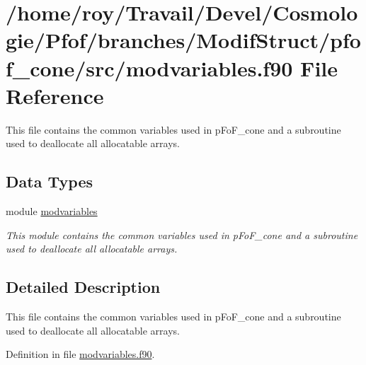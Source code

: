 \hypertarget{modvariables_8f90}{\section{/home/roy/\-Travail/\-Devel/\-Cosmologie/\-Pfof/branches/\-Modif\-Struct/pfof\-\_\-cone/src/modvariables.f90 File Reference}
\label{modvariables_8f90}
}


This file contains the common variables used in p\-Fo\-F\-\_\-cone and a subroutine used to deallocate all allocatable arrays.  


\subsection*{Data Types}
\begin{DoxyCompactItemize}
\item 
module \hyperlink{classmodvariables}{modvariables}
\begin{DoxyCompactList}\small\item\em This module contains the common variables used in p\-Fo\-F\-\_\-cone and a subroutine used to deallocate all allocatable arrays. \end{DoxyCompactList}\end{DoxyCompactItemize}


\subsection{Detailed Description}
This file contains the common variables used in p\-Fo\-F\-\_\-cone and a subroutine used to deallocate all allocatable arrays. 

Definition in file \hyperlink{modvariables_8f90_source}{modvariables.\-f90}.

